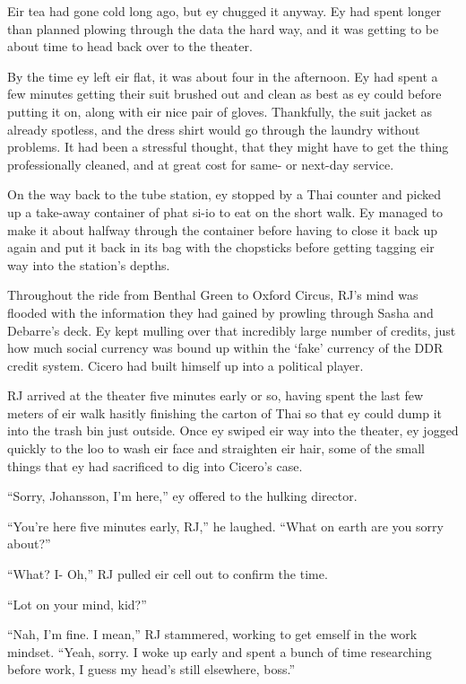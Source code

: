 Eir tea had gone cold long ago, but ey chugged it anyway.  Ey had spent longer than planned plowing through the data the hard way, and it was getting to be about time to head back over to the theater.

\secdiv

By the time ey left eir flat, it was about four in the afternoon.  Ey had spent a few minutes getting their suit brushed out and clean as best as ey could before putting it on, along with eir nice pair of gloves.  Thankfully, the suit jacket as already spotless, and the dress shirt would go through the laundry without problems.  It had been a stressful thought, that they might have to get the thing professionally cleaned, and at great cost for same- or next-day service.

On the way back to the tube station, ey stopped by a Thai counter and picked up a take-away container of phat si-io to eat on the short walk.  Ey managed to make it about halfway through the container before having to close it back up again and put it back in its bag with the chopsticks before getting tagging eir way into the station's depths.

Throughout the ride from Benthal Green to Oxford Circus, RJ's mind was flooded with the information they had gained by prowling through Sasha and Debarre's deck.  Ey kept mulling over that incredibly large number of credits, just how much social currency was bound up within the `fake' currency of the DDR credit system.  Cicero had built himself up into a political player.

RJ arrived at the theater five minutes early or so, having spent the last few meters of eir walk hasitly finishing the carton of Thai so that ey could dump it into the trash bin just outside.  Once ey swiped eir way into the theater, ey jogged quickly to the loo to wash eir face and straighten eir hair, some of the small things that ey had sacrificed to dig into Cicero's case.

``Sorry, Johansson, I'm here,'' ey offered to the hulking director.

``You're here five minutes early, RJ,'' he laughed.  ``What on earth are you sorry about?''

``What?  I-  Oh,''  RJ pulled eir cell out to confirm the time.

``Lot on your mind, kid?''

``Nah, I'm fine.  I mean,'' RJ stammered, working to get emself in the work mindset.  ``Yeah, sorry.  I woke up early and spent a bunch of time researching before work, I guess my head's still elsewhere, boss.''

